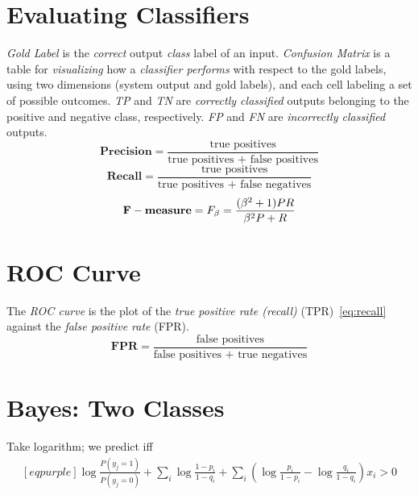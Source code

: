 \documentclass[
	exam={Midterm}
]{cs584exam}
\begin{document}
\section{Evaluating Classifiers}\label{sec:evaluating-classifiers}
\emph{Gold Label} is the \emph{correct} output \emph{class} label of an input.
\emph{Confusion Matrix} is a table for \emph{visualizing} how a \emph{classifier performs} with respect to the gold labels, using two dimensions (system output and gold labels), and each cell labeling a set of possible outcomes.
\emph{TP} and \emph{TN} are \emph{correctly classified} outputs belonging to the positive and negative class, respectively.
\emph{FP} and \emph{FN} are \emph{incorrectly classified} outputs.
\begin{equation}
	\mathbf{Precision} = \frac{\mbox{true positives}}{\mbox{true positives } + \mbox{ false positives}}
	\label{eq:precision}
\end{equation}
\begin{equation}
	\mathbf{Recall} = \frac{\mbox{true positives}}{\mbox{true positives } + \mbox{ false negatives}}
	\label{eq:recall}
\end{equation}
\begin{equation}
	\mathbf{F-measure} = F_{\beta} = \frac{(\beta^{2} + 1)PR}{\beta^{2}P + R}\\
	\label{eq:f-measure}
\end{equation}

\section{ROC Curve}\label{sec:roc-curve}
The \emph{ROC curve} is the plot of the \emph{true positive rate (recall)} (TPR)~\eqref{eq:recall} against the \emph{false positive rate} (FPR).
\begin{equation}
	\mathbf{FPR} = \frac{\mbox{false positives}}{\mbox{false positives } + \mbox{ true negatives}}
	\label{eq:fpr}
\end{equation}

\section{\Naive Bayes: Two Classes}\label{sec:naive-bayes:-two-classes}
Take logarithm; we predict  iff
\begin{equation*}
	\begin{aligned}[eqpurple]
		\log \frac{P(y_{j}=1)}{P(y_{j}=0)} + \sum_{i}\log \frac{1-p_{i}}{1-q_{i}} + \sum_{i}\left( \log\frac{p_{i}}{1-p_{i}} - \log\frac{q_{i}}{1-q_{i}} \right)x_{i} > 0
	\end{aligned}
\end{equation*}
\end{document}
